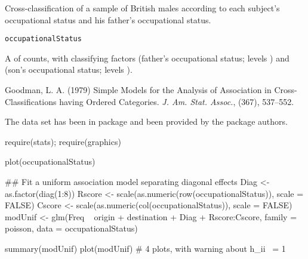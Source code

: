 %
\begin{Examples}
\end{Examples}
%
\begin{Description}\relax
Cross-classification of a sample of British males according to each
subject's occupational status and his father's occupational status.
\end{Description}
%
\begin{Usage}
\begin{verbatim}
occupationalStatus
\end{verbatim}
\end{Usage}
%
\begin{Format}
A  of counts, with classifying factors
 (father's occupational status; levels )
and  (son's occupational status; levels ).
\end{Format}
%
\begin{Source}\relax
Goodman, L. A. (1979)
Simple Models for the Analysis of Association in Cross-Classifications
having Ordered Categories.
\emph{J. Am. Stat. Assoc.},  (367), 537--552.

The data set has been in package  and been provided by the
package authors.
\end{Source}
%
\begin{Examples}
\begin{ExampleCode}
require(stats); require(graphics)

plot(occupationalStatus)

##  Fit a uniform association model separating diagonal effects
Diag <- as.factor(diag(1:8))
Rscore <- scale(as.numeric(row(occupationalStatus)), scale = FALSE)
Cscore <- scale(as.numeric(col(occupationalStatus)), scale = FALSE)
modUnif <- glm(Freq ~ origin + destination + Diag + Rscore:Cscore,
               family = poisson, data = occupationalStatus)

summary(modUnif)
plot(modUnif) # 4 plots, with warning about  h_ii ~= 1
\end{ExampleCode}
\end{Examples}
